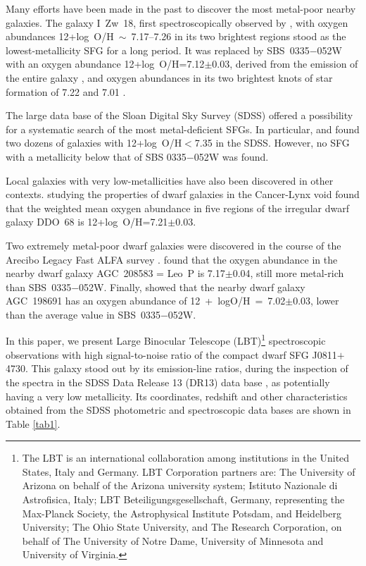 \documentclass[useAMS,usenatbib]{mn2e}
\begin{document}
Many efforts have been made in the past to discover the most metal-poor nearby
galaxies. The galaxy I~Zw~18, first spectroscopically observed by \citet{SS72},
with oxygen abundances 12+log~O/H~$\sim$~7.17--7.26 in its two brightest
regions \citep[e.g. ][]{SK93,IT98} stood as the lowest-metallicity SFG for a 
long period. It was replaced by SBS~0335$-$052W with an  
oxygen abundance 12+log~O/H=7.12$\pm$0.03, 
derived from the emission of the entire galaxy \citep{I05},
and oxygen abundances in its two brightest knots of star formation 
of 7.22 and 7.01 \citep{I09}. 

The large data base of the Sloan Digital Sky Survey (SDSS) offered a possibility
for a systematic search of the most metal-deficient SFGs. 
In particular, \citet{I12} and \citet{G17}
found two dozens of galaxies with 12+log~O/H$<$7.35 in the 
SDSS. However, no SFG with a metallicity below that
of SBS 0335$-$052W was found.

Local galaxies with very low-metallicities have also been discovered in other 
contexts. 
\citet*{P05} 
studying the properties of dwarf galaxies in the Cancer-Lynx void
found that the weighted mean oxygen abundance in five regions of 
the irregular dwarf galaxy DDO~68 is 12+log~O/H=7.21$\pm$0.03.

Two extremely metal-poor dwarf galaxies were discovered in the
course of the  Arecibo Legacy Fast ALFA survey \citep[ALFALFA, ][]{G05,H11}.
\citet{S13} found that the oxygen abundance in the nearby dwarf galaxy 
AGC~208583 = Leo~P is 7.17$\pm$0.04, still more metal-rich than SBS~0335$-$052W.
Finally, \citet{H16} showed that the nearby dwarf galaxy AGC~198691
has an oxygen abundance of 12~+~logO/H~=~7.02$\pm$0.03, lower than the 
average value in SBS~0335$-$052W.




In this paper, we present Large Binocular Telescope (LBT)\footnote{The LBT 
is an international collaboration among institutions in the United States, 
Italy and Germany. LBT Corporation partners are: The University of Arizona on 
behalf of the Arizona university system; Istituto Nazionale di Astrofisica, 
Italy; LBT Beteiligungsgesellschaft, Germany, representing the Max-Planck 
Society, 
the Astrophysical Institute Potsdam, and Heidelberg University; The Ohio State 
University, and The Research Corporation, on behalf of The University of Notre 
Dame, University of Minnesota and University of Virginia.} spectroscopic
observations with high signal-to-noise ratio of the compact dwarf SFG 
J0811$+$4730. This galaxy stood out by its emission-line ratios, 
during the inspection of the  
spectra in the SDSS Data Release 13 (DR13) data base \citep{A16}, as 
potentially having a very low metallicity. 
Its coordinates, redshift and other characteristics obtained from the SDSS
photometric and spectroscopic data bases are shown in Table \ref{tab1}.
\end{document}
